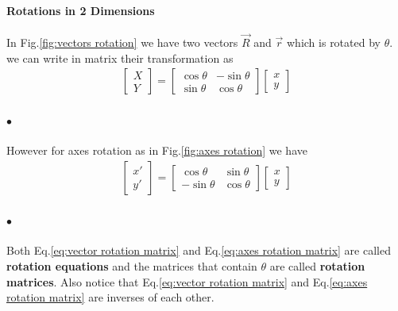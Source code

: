             \paragraph{Rotations in 2 Dimensions} %
            \label{par:Rotations in 2 Dimensions}
            In Fig.\eqref{fig:vectors rotation} we have two vectors $\vec{R}$  and $\vec{r}$ which is rotated by $\theta$.
            we can write in matrix their transformation as 
            \begin{align}
                \label{eq:vector rotation matrix}
                \begin{bmatrix}
                    X \\ Y
                \end{bmatrix} = 
                \begin{bmatrix}
                    \cos{\theta} & -\sin{\theta} \\
                    \sin{\theta} & \cos{\theta}
                \end{bmatrix} 
                \begin{bmatrix}
                    x \\ y
                \end{bmatrix}
            \end{align}
            
            \paragraph{$\bullet$} However for axes rotation as in Fig.\eqref{fig:axes rotation} we have 
            \begin{align}
                \label{eq:axes rotation matrix}
                \begin{bmatrix}
                    x' \\ y'
                \end{bmatrix} = 
                \begin{bmatrix}
                    \cos{\theta} & \sin{\theta} \\
                    -\sin{\theta} & \cos{\theta}
                \end{bmatrix} 
                \begin{bmatrix}
                    x \\ y
                \end{bmatrix}
            \end{align}

            \paragraph{$\bullet$} Both Eq.\eqref{eq:vector rotation matrix} and Eq.\eqref{eq:axes rotation matrix} are called \textbf{rotation equations}
            and the matrices that contain $\theta$ are called \textbf{rotation matrices}. Also notice that Eq.\eqref{eq:vector rotation matrix} 
            and Eq.\eqref{eq:axes rotation matrix} are inverses of each other.

